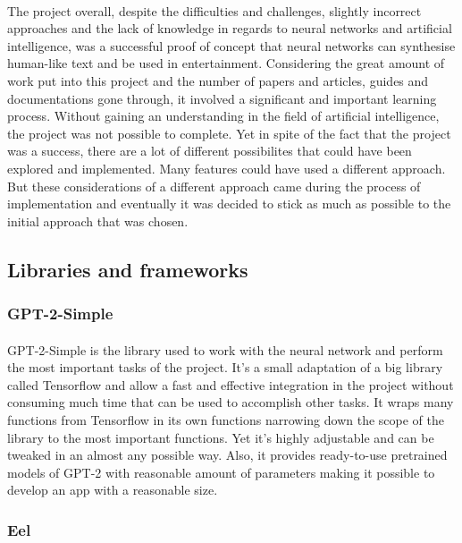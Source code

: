 \documentclass[12pt]{report}
\begin{document}
\paragraph{}
The project overall, despite the difficulties and challenges, slightly incorrect approaches and the lack of knowledge
in regards to neural networks and artificial intelligence, was a successful proof of concept that neural networks can
synthesise human-like text and be used in entertainment. Considering the great amount of work put into this project and
the number of papers and articles, guides and documentations gone through, it involved a significant and important learning process.
Without gaining an understanding in the field of artificial intelligence, the project was not possible to complete. Yet
in spite of the fact that the project was a success, there are a lot of different possibilites that could have been
explored and implemented. Many features could have used a different approach. But these considerations of a different approach 
came during the process of implementation and eventually it was decided to stick as much as possible to the initial approach that was chosen.

\subsection*{Libraries and frameworks}
\subsubsection*{GPT-2-Simple}
\paragraph{}
GPT-2-Simple is the library used to work with the neural network and perform the most important tasks of the project.
It's a small adaptation of a big library called Tensorflow and allow a fast and effective integration in the project
without consuming much time that can be used to accomplish other tasks. It wraps many functions from Tensorflow in
its own functions narrowing down the scope of the library to the most important functions. Yet it's highly adjustable
and can be tweaked in an almost any possible way. Also, it provides ready-to-use pretrained models of GPT-2 with
reasonable amount of parameters making it possible to develop an app with a reasonable size.

\subsubsection*{Eel}
\end{document}
